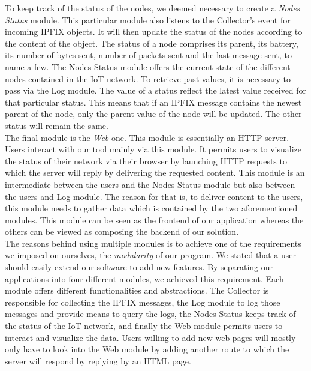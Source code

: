 To keep track of the status of the nodes, we deemed necessary to create a \textit{Nodes Status} module. This particular module also listens to the Collector's event for incoming IPFIX objects. It will then update the status of the nodes according to the content of the object. The status of a node comprises its parent, its battery, its number of bytes sent, number of packets sent and the last message sent, to name a few. The Nodes Status module offers the current state of the different nodes contained in the IoT network. To retrieve past values, it is necessary to pass via the Log module. The value of a status reflect the latest value received for that particular status. This means that if an IPFIX message contains the newest parent of the node, only the parent value of the node will be updated. The other status will remain the same.  \\

The final module is the \textit{Web} one. This module is essentially an HTTP server. Users interact with our tool mainly via this module. It permits users to visualize the status of their network via their browser by launching HTTP requests to which the server will reply by delivering the requested content. This module is an intermediate between the users and the Nodes Status module but also between the users and Log module. The reason for that is, to deliver content to the users, this module needs to gather data which is contained by the two aforementioned modules. This module can be seen as the frontend of our application whereas the others can be viewed as composing the backend of our solution.\\

The reasons behind using multiple modules is to achieve one of the requirements we imposed on ourselves, the \textit{modularity} of our program. We stated that a user should easily extend our software to add new features. By separating our applications into four different modules, we achieved this requirement. Each module offers different functionalities and abstractions. The Collector is responsible for collecting the IPFIX messages, the Log module to log those messages and provide means to query the logs, the Nodes Status keeps track of the status of the IoT network, and finally the Web module permits users to interact and visualize the data. Users willing to add new web pages will mostly only have to look into the Web module by adding another route to which the server will respond by replying by an HTML page. \\

